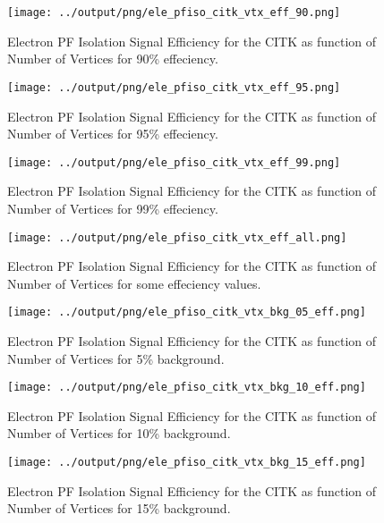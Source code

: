 \documentclass[11pt]{book}
\begin{document}
\begin{figure}[htb]
\centering
\texttt{[image: ../output/png/ele\_pfiso\_citk\_vtx\_eff\_90.png]}
\caption{Electron PF Isolation Signal Efficiency for the CITK as function of Number of Vertices for 90\% effeciency.}
\label{fig:ele_pfiso_vtx_eff_citk_eff_90}
\end{figure}

\begin{figure}[htb]
\centering
\texttt{[image: ../output/png/ele\_pfiso\_citk\_vtx\_eff\_95.png]}
\caption{Electron PF Isolation Signal Efficiency for the CITK as function of Number of Vertices for 95\% effeciency.}
\label{fig:ele_pfiso_vtx_eff_citk_eff_95}
\end{figure}

\begin{figure}[htb]
\centering
\texttt{[image: ../output/png/ele\_pfiso\_citk\_vtx\_eff\_99.png]}
\caption{Electron PF Isolation Signal Efficiency for the CITK as function of Number of Vertices for 99\% effeciency.}
\label{fig:ele_pfiso_vtx_eff_citk_eff_99}
\end{figure}

\begin{figure}[htb]
\centering
\texttt{[image: ../output/png/ele\_pfiso\_citk\_vtx\_eff\_all.png]}
\caption{Electron PF Isolation Signal Efficiency for the CITK as function of Number of Vertices for some effeciency values.}
\label{fig:ele_pfiso_vtx_eff_citk_eff_all}
\end{figure}

\begin{figure}[htb]
\centering
\texttt{[image: ../output/png/ele\_pfiso\_citk\_vtx\_bkg\_05\_eff.png]}
\caption{Electron PF Isolation Signal Efficiency for the CITK as function of Number of Vertices for 5\% background.}
\label{fig:ele_pfiso_vtx_eff_citk_bkg_05_eff}
\end{figure}

\begin{figure}[htb]
\centering
\texttt{[image: ../output/png/ele\_pfiso\_citk\_vtx\_bkg\_10\_eff.png]}
\caption{Electron PF Isolation Signal Efficiency for the CITK as function of Number of Vertices for 10\% background.}
\label{fig:ele_pfiso_vtx_eff_citk_bkg_10_eff}
\end{figure}

\begin{figure}[htb]
\centering
\texttt{[image: ../output/png/ele\_pfiso\_citk\_vtx\_bkg\_15\_eff.png]}
\caption{Electron PF Isolation Signal Efficiency for the CITK as function of Number of Vertices for 15\% background.}
\label{fig:ele_pfiso_vtx_eff_citk_bkg_15_eff}
\end{figure}
\end{document}
